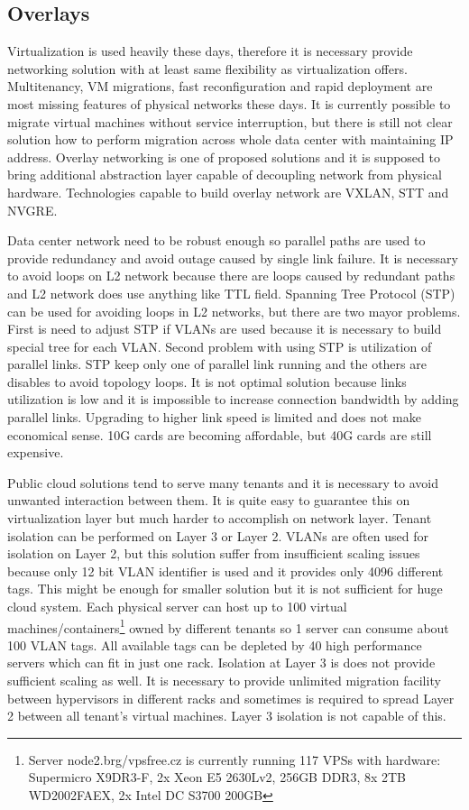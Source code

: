 \subsection{Overlays}
Virtualization is used heavily these days, therefore it is necessary provide networking solution with at least same flexibility as virtualization offers. Multitenancy, \Ac{VM} migrations, fast reconfiguration and rapid deployment are most missing features of physical networks these days. It is currently possible to migrate virtual machines without service interruption, but there is still not clear solution how to perform migration across whole data center with maintaining \Ac{IP} address. Overlay networking is one of proposed solutions and it is supposed to bring additional abstraction layer capable of decoupling network from physical hardware. 
Technologies capable to build overlay network are \Ac{VXLAN}, \Ac{STT} and \Ac{NVGRE}. 

Data center network need to be robust enough so parallel paths are used to provide redundancy and avoid outage caused by single link failure. It is necessary to avoid loops on L2 network because there are loops caused by redundant paths and L2 network does use anything like \Ac{TTL} field.  Spanning Tree Protocol (\Ac{STP}) can be used for avoiding loops in L2 networks, but there are two mayor problems. First is need to adjust \Ac{STP} if \Ac{VLAN}s are used because it is necessary to build special tree for each \Ac{VLAN}. Second problem with using \Ac{STP} is utilization of parallel links. \Ac{STP} keep only one of parallel link running and the others are disables to avoid topology loops. It is not optimal solution because links utilization is low and it is impossible to increase connection bandwidth by adding parallel links. Upgrading to higher link speed is limited and does not make economical sense. 10G cards are becoming affordable, but 40G cards are still expensive.

Public cloud solutions tend to serve many tenants and it is necessary to avoid unwanted interaction between them. It is quite easy to guarantee this on virtualization layer but much harder to accomplish on network layer. Tenant isolation can be performed on Layer 3 or Layer 2. \Ac{VLAN}s are often used for isolation on Layer 2, but this solution suffer from insufficient scaling issues because only 12 bit \Ac{VLAN} identifier is used and it provides only 4096 different tags. This might be enough for smaller solution but it is not sufficient for huge cloud system. Each physical server can host up to 100 virtual machines/containers\footnote{Server node2.brg/vpsfree.cz is currently running 117 \Ac{VPS}s with hardware: Supermicro \mbox{X9DR3-F}, 2x Xeon E5 2630Lv2, 256GB DDR3, 8x 2TB WD2002FAEX, 2x Intel DC S3700 200GB} owned by different tenants so 1 server can consume about 100 \Ac{VLAN} tags. All available tags can be depleted by 40 high performance servers which can fit in just one rack. Isolation at Layer 3 is does not provide sufficient scaling as well. It is necessary to provide unlimited migration facility between hypervisors in different racks and sometimes is required to spread Layer 2 between all tenant's virtual machines. Layer 3 isolation is not capable of this.

